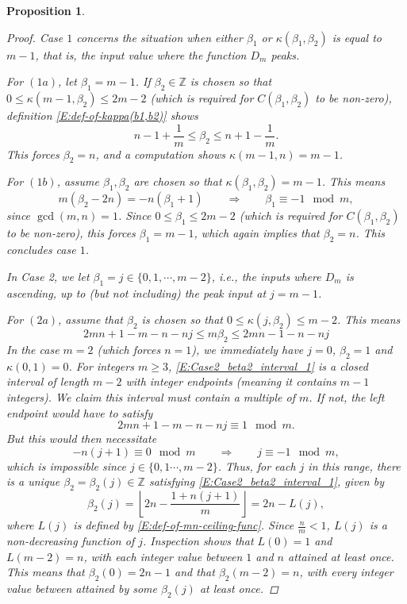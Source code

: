 \documentclass[letterpaper,11pt,reqno]{amsart}
\theoremstyle{plain}
\newtheorem{proposition}[equation]{Proposition}
\theoremstyle{definition}
\theoremstyle{remark}
\theoremstyle{remark}
\numberwithin{equation}{section}
\newcommand{\Z}{{\mathbb Z}}
\begin{document}
\begin{proposition}
\begin{proof}
Case $1$ concerns the situation when either $\beta_1$ or $\kappa(\beta_1,\beta_2)$ is equal to $m-1$, that is, the input value where the function $D_m$ peaks.

For $(1a)$, let $\beta_1 = m-1$. 
If $\beta_2 \in \Z$ is chosen so that $0 \le \kappa(m-1,\beta_2) \le 2m-2$ (which is required for $C(\beta_1,\beta_2)$ to be non-zero), definition \eqref{E:def-of-kappa(b1,b2)} shows
\begin{equation*}
n-1+\frac{1}{m} \le \beta_2 \le n + 1 -\frac{1}{m}.
\end{equation*}
This forces $\beta_2 = n$, and a computation shows $\kappa(m-1,n) = m-1$.

For $(1b)$, assume $\beta_1,\beta_2$ are chosen so that $\kappa(\beta_1,\beta_2) = m-1$.
This means
\begin{equation*}
m(\beta_2-2n) = -n(\beta_1+1) \qquad \Longrightarrow \qquad \beta_1 \equiv -1 \mod m,
\end{equation*}
since $\gcd(m,n)=1$.
Since $0\le \beta_1 \le 2m-2$ (which is required for $C(\beta_1,\beta_2)$ to be non-zero), this forces $\beta_1 = m-1$, which again implies that $\beta_2 = n$.
This concludes case $1$.

In Case 2, we let $\beta_1 = j \in \{0,1,\cdots,m-2 \}$, i.e., the inputs where $D_m$ is ascending, up to (but not including) the peak input at $j=m-1$.

For $(2a)$, assume that $\beta_2$ is chosen so that $0 \le \kappa(j,\beta_2) \le m-2$.
This means 
\begin{equation}\label{E:Case2_beta2_interval_1}
2mn +1 -m -n -nj \le m \beta_2 \le 2mn -1 -n -nj
\end{equation}
In the case $m=2$ (which forces $n=1$), we immediately have $j=0$, $\beta_2 = 1$ and $\kappa(0,1) = 0$.
For integers $m \ge 3$, \eqref{E:Case2_beta2_interval_1} is a closed interval of length $m-2$ with integer endpoints (meaning it contains $m-1$ integers).
We claim this interval must contain a multiple of $m$.
If not, the left endpoint would have to satisfy
\begin{equation*}
2mn +1 -m -n -nj \equiv 1 \mod m.
\end{equation*}
But this would then necessitate
\begin{equation*}
-n(j+1) \equiv 0 \mod m \qquad \Longrightarrow \qquad j \equiv -1 \mod m,
\end{equation*}
which is impossible since $j \in \{0,1 \cdots, m-2\}$.
Thus, for each $j$ in this range, there is a unique $\beta_2 = \beta_2(j) \in \Z$ satisfying \eqref{E:Case2_beta2_interval_1}, given by
\begin{equation}\label{E:beta2-def-inside-proof}
\beta_2(j) = \left\lfloor 2n - \frac{1+n(j+1)}{m}  \right\rfloor = 2n - L(j),
\end{equation}
where $L(j)$ is defined by \eqref{E:def-of-mn-ceiling-func}. 
Since $\frac{n}{m}<1$, $L(j)$ is a non-decreasing function of $j$.
Inspection shows that $L(0) = 1$ and $L(m-2) = n$, with each integer value between $1$ and $n$ attained at least once.
This means that $\beta_2(0) = 2n-1$ and that $\beta_2(m-2) = n$, with every integer value between attained by some $\beta_2(j)$ at least once.


\end{proof}
\end{proposition}
\end{document}
